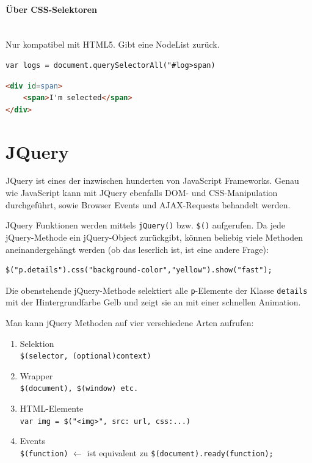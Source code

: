 \documentclass[a4paper, 11pt]{article}
\newcommand{\code}[1]{\texttt{#1}}
\begin{document}
\paragraph{Über CSS-Selektoren}\mbox{}\\
Nur kompatibel mit HTML5. Gibt eine NodeList zurück.
\begin{lstlisting}
var logs = document.querySelectorAll("#log>span)
\end{lstlisting}
\begin{lstlisting}[language=html]
<div id=span>
	<span>I'm selected</span>
</div>
\end{lstlisting}

\section{JQuery}
JQuery ist eines der inzwischen hunderten von JavaScript Frameworks. Genau wie JavaScript kann mit JQuery ebenfalls DOM- und CSS-Manipulation durchgeführt, sowie Browser Events und AJAX-Requests behandelt werden.

\vspace{10px}

\noindent JQuery Funktionen werden mittels \code{jQuery()} bzw. \code{\$()} aufgerufen. Da jede jQuery-Methode ein jQuery-Object zurückgibt, können beliebig viele Methoden aneinandergehängt werden (ob das leserlich ist, ist eine andere Frage):

\begin{lstlisting}
$("p.details").css("background-color","yellow").show("fast");
\end{lstlisting}
Die obenstehende jQuery-Methode selektiert alle \code{p}-Elemente der Klasse \code{details} mit der Hintergrundfarbe Gelb und zeigt sie an mit einer schnellen Animation.

\vspace{10px}

\noindent Man kann jQuery Methoden auf vier verschiedene Arten aufrufen:
\begin{enumerate}
	\item Selektion \\
		\code{\$(selector, (optional)context)}
	\item Wrapper\\
		\code{\$(document), \$(window) etc.}
	\item HTML-Elemente\\
		\code{var img = \$("<img>", {src: url, css:{...}})}
	\item Events\\
		\code{\$(function)} $\leftarrow$ ist equivalent zu \code{\$(document).ready(function);}
\end{enumerate}
\end{document}
